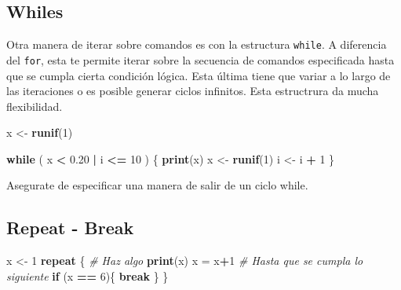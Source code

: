 \documentclass[]{article}
\newenvironment{Shaded}{\begin{snugshade}}{\end{snugshade}}
\newcommand{\KeywordTok}[1]{\textcolor[rgb]{0.13,0.29,0.53}{\textbf{#1}}}
\newcommand{\DecValTok}[1]{\textcolor[rgb]{0.00,0.00,0.81}{#1}}
\newcommand{\FloatTok}[1]{\textcolor[rgb]{0.00,0.00,0.81}{#1}}
\newcommand{\StringTok}[1]{\textcolor[rgb]{0.31,0.60,0.02}{#1}}
\newcommand{\CommentTok}[1]{\textcolor[rgb]{0.56,0.35,0.01}{\textit{#1}}}
\newcommand{\ControlFlowTok}[1]{\textcolor[rgb]{0.13,0.29,0.53}{\textbf{#1}}}
\newcommand{\OperatorTok}[1]{\textcolor[rgb]{0.81,0.36,0.00}{\textbf{#1}}}
\newcommand{\NormalTok}[1]{#1}
\begin{document}
\subsection{Whiles}\label{whiles}

Otra manera de iterar sobre comandos es con la estructura
\texttt{while}. A diferencia del \texttt{for}, esta te permite iterar
sobre la secuencia de comandos especificada hasta que se cumpla cierta
condición lógica. Esta última tiene que variar a lo largo de las
iteraciones o es posible generar ciclos infinitos. Esta estructrura da
mucha flexibilidad.

\begin{Shaded}
\begin{Highlighting}[]
\NormalTok{x <-}\StringTok{ }\KeywordTok{runif}\NormalTok{(}\DecValTok{1}\NormalTok{)}

\ControlFlowTok{while}\NormalTok{ ( x }\OperatorTok{<}\StringTok{ }\FloatTok{0.20} \OperatorTok{|}\StringTok{ }\NormalTok{i }\OperatorTok{<=}\StringTok{ }\DecValTok{10}\NormalTok{ ) \{}
  \KeywordTok{print}\NormalTok{(x)}
\NormalTok{  x <-}\StringTok{ }\KeywordTok{runif}\NormalTok{(}\DecValTok{1}\NormalTok{)}
\NormalTok{  i <-}\StringTok{ }\NormalTok{i }\OperatorTok{+}\StringTok{ }\DecValTok{1}
\NormalTok{\}}
\end{Highlighting}
\end{Shaded}

\begin{nota}[Importante]
Asegurate de especificar una manera de salir de un ciclo while.
\end{nota}

\subsection{Repeat - Break}\label{repeat---break}

\begin{Shaded}
\begin{Highlighting}[]
\NormalTok{x <-}\StringTok{ }\DecValTok{1}
\ControlFlowTok{repeat}\NormalTok{ \{}
  \CommentTok{# Haz algo}
  \KeywordTok{print}\NormalTok{(x)}
\NormalTok{  x =}\StringTok{ }\NormalTok{x}\OperatorTok{+}\DecValTok{1}
  \CommentTok{# Hasta que se cumpla lo siguiente}
  \ControlFlowTok{if}\NormalTok{ (x }\OperatorTok{==}\StringTok{ }\DecValTok{6}\NormalTok{)\{}
    \ControlFlowTok{break}
\NormalTok{  \}}
\NormalTok{\}}
\end{Highlighting}
\end{Shaded}
\end{document}

